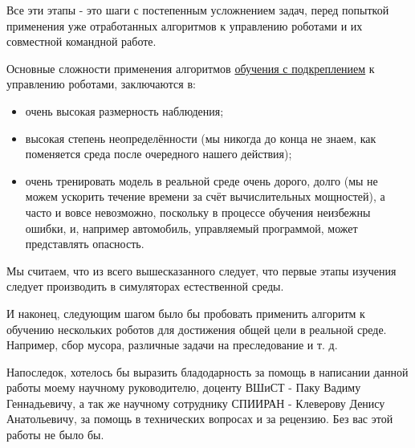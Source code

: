 Все эти этапы - это шаги с постепенным усложнением задач, перед попыткой применения уже отработанных алгоритмов к управлению роботами и их совместной командной работе.

Основные сложности применения алгоритмов \hyperref[acr:rl]{обучения с подкреплением} к управлению роботами, заключаются в:
\begin{itemize}
	\item очень высокая размерность наблюдения;
	\item высокая степень неопределённости (мы никогда до конца не знаем, как поменяется среда после очередного нашего действия);
	\item очень тренировать модель в реальной среде очень дорого, долго (мы не можем ускорить течение времени за счёт вычислительных мощностей), а часто и вовсе невозможно, поскольку в процессе обучения неизбежны ошибки, и, например автомобиль, управляемый программой, может представлять опасность.
\end{itemize}

Мы считаем, что из всего вышесказанного следует, что первые этапы изучения следует производить в симуляторах естественной среды.

И наконец, следующим шагом было бы пробовать применить алгоритм к обучению нескольких роботов для достижения общей цели в реальной среде. Например, сбор мусора, различные задачи на преследование и т. д.

Напоследок, хотелось бы выразить бладодарность за помощь в написании данной работы моему научному руководителю, доценту ВШиСТ - Паку Вадиму Геннадьевичу, а так же научному сотруднику СПИИРАН - Клеверову Денису Анатольевичу, за помощь в технических вопросах и за рецензию. Без вас этой работы не было бы.

